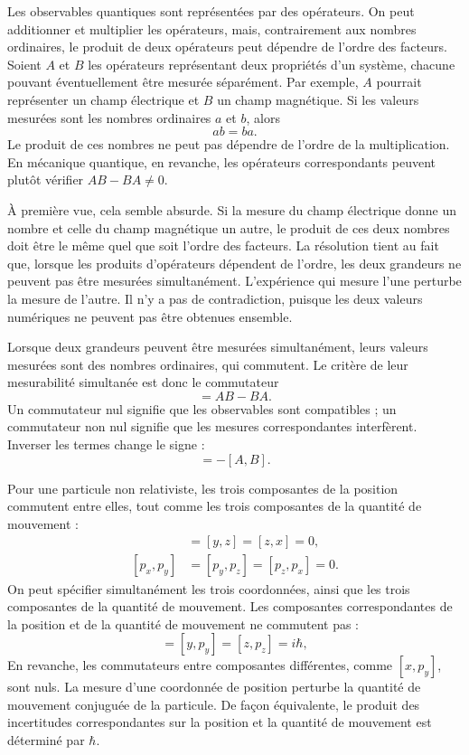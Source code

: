 Les observables quantiques sont représentées par des opérateurs. On peut additionner et multiplier les opérateurs, mais, contrairement aux nombres ordinaires, le produit de deux opérateurs peut dépendre de l’ordre des facteurs. Soient \(A\) et \(B\) les opérateurs représentant deux propriétés d’un système, chacune pouvant éventuellement être mesurée séparément. Par exemple, \(A\) pourrait représenter un champ électrique et \(B\) un champ magnétique. Si les valeurs mesurées sont les nombres ordinaires \(a\) et \(b\), alors
\begin{equation}
ab=ba.
\end{equation}
Le produit de ces nombres ne peut pas dépendre de l’ordre de la multiplication. En mécanique quantique, en revanche, les opérateurs correspondants peuvent plutôt vérifier \(AB-BA\neq0\).

À première vue, cela semble absurde. Si la mesure du champ électrique donne un nombre et celle du champ magnétique un autre, le produit de ces deux nombres doit être le même quel que soit l’ordre des facteurs. La résolution tient au fait que, lorsque les produits d’opérateurs dépendent de l’ordre, les deux grandeurs ne peuvent pas être mesurées simultanément. L’expérience qui mesure l’une perturbe la mesure de l’autre. Il n’y a pas de contradiction, puisque les deux valeurs numériques ne peuvent pas être obtenues ensemble.

Lorsque deux grandeurs peuvent être mesurées simultanément, leurs valeurs mesurées sont des nombres ordinaires, qui commutent. Le critère de leur mesurabilité simultanée est donc le commutateur
\begin{equation}
[A,B]=AB-BA.
\end{equation}
Un commutateur nul signifie que les observables sont compatibles ; un commutateur non nul signifie que les mesures correspondantes interfèrent. Inverser les termes change le signe :
\begin{equation}
[B,A]=-[A,B].
\end{equation}

Pour une particule non relativiste, les trois composantes de la position commutent entre elles, tout comme les trois composantes de la quantité de mouvement :
\begin{align}
[x,y]&=[y,z]=[z,x]=0,\\
[p_x,p_y]&=[p_y,p_z]=[p_z,p_x]=0.
\end{align}
On peut spécifier simultanément les trois coordonnées, ainsi que les trois composantes de la quantité de mouvement. Les composantes correspondantes de la position et de la quantité de mouvement ne commutent pas :
\begin{equation}
[x,p_x]=[y,p_y]=[z,p_z]=i\hbar,
\end{equation}
En revanche, les commutateurs entre composantes différentes, comme \([x,p_y]\), sont nuls. La mesure d’une coordonnée de position perturbe la quantité de mouvement conjuguée de la particule. De façon équivalente, le produit des incertitudes correspondantes sur la position et la quantité de mouvement est déterminé par \(\hbar\).

